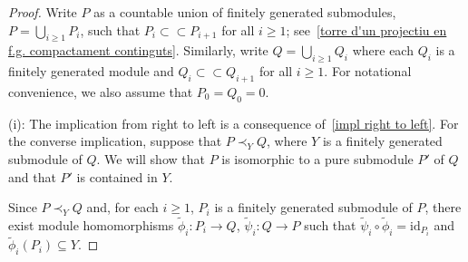 \documentclass[11pt]{amsart}
\numberwithin{equation}{section}
\theoremstyle{definition}
\theoremstyle{plain}
\theoremstyle{definition}
\begin{document}
\begin{proof}
Write $P$ as a countable union of finitely generated submodules, $P = \bigcup_{i \geq 1} P_i$, such that $P_i \subset\!\subset P_{i+1}$ for all $i \geq 1$; see~\autoref{torre d'un projectiu en f.g. compactament continguts}. Similarly, write $Q = \bigcup_{i \geq 1} Q_i$ where each $Q_i$ is a finitely generated module and $Q_i \subset\!\subset Q_{i+1}$ for all $i \geq 1$. For notational convenience, we also assume that $P_0 = Q_0 = 0$. 

(i): The implication from right to left is a consequence of~\autoref{impl right to left}. For the converse implication, suppose that $P \prec_Y Q$, where $Y$ is a finitely generated submodule of $Q$. We will show that $P$ is isomorphic to a pure submodule $P'$ of $Q$ and that $P'$ is contained in $Y$. 

Since $P \prec_Y Q$ and, for each $i \geq 1$, $P_i$ is a finitely generated submodule of $P$, there exist module homomorphisms $\tilde{\phi}_i \colon P_i \rightarrow Q$, $\tilde{\psi}_i\colon Q \rightarrow P$ such that $\tilde{\psi}_i \circ \tilde{\phi}_i = \mathrm{id}_{P_i}$ and $\tilde{\phi}_i(P_i) \subseteq Y$. 




\end{proof}
\end{document}
